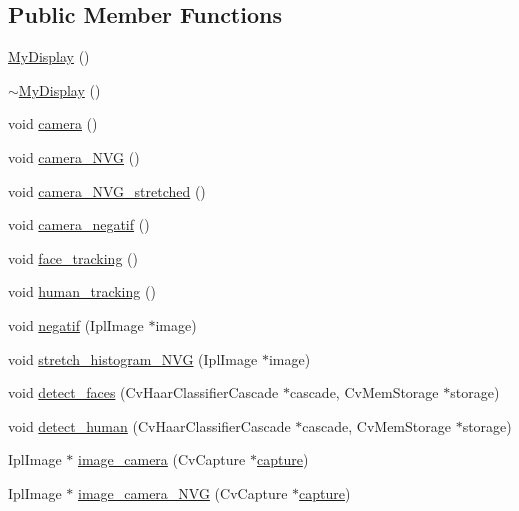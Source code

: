 \subsection*{Public Member Functions}
\begin{DoxyCompactItemize}
\item 
\hyperlink{classMyDisplay_aaf21029e4055eaadf1d750514b3b800a}{My\-Display} ()
\item 
\hyperlink{classMyDisplay_ac60f1fded498f57332783a5b66264c8c}{$\sim$\-My\-Display} ()
\item 
void \hyperlink{classMyDisplay_a00b712ee117708d620dc80d84d3e7281}{camera} ()
\item 
void \hyperlink{classMyDisplay_abfe046ec64aef3f9487e76c5a523bb48}{camera\-\_\-\-N\-V\-G} ()
\item 
void \hyperlink{classMyDisplay_a15661db4339f486356e93716c65a3a7a}{camera\-\_\-\-N\-V\-G\-\_\-stretched} ()
\item 
void \hyperlink{classMyDisplay_ac2ce70a95b5dd437951d3ebc7f3756d3}{camera\-\_\-negatif} ()
\item 
void \hyperlink{classMyDisplay_a8033377d23dca5526634eded73efb902}{face\-\_\-tracking} ()
\item 
void \hyperlink{classMyDisplay_a23cd838f0f2300db6370334ab60b99e6}{human\-\_\-tracking} ()
\item 
void \hyperlink{classMyDisplay_aed313dcbb8592f0786479321ebcadb54}{negatif} (Ipl\-Image $\ast$image)
\item 
void \hyperlink{classMyDisplay_a62ac61c3751293a48dad6a7254d039c0}{stretch\-\_\-histogram\-\_\-\-N\-V\-G} (Ipl\-Image $\ast$image)
\item 
void \hyperlink{classMyDisplay_a85d57087410b57368b92661fc63a6488}{detect\-\_\-faces} (Cv\-Haar\-Classifier\-Cascade $\ast$cascade, Cv\-Mem\-Storage $\ast$storage)
\item 
void \hyperlink{classMyDisplay_acbd50379c2ac9d3a275699550ba8530d}{detect\-\_\-human} (Cv\-Haar\-Classifier\-Cascade $\ast$cascade, Cv\-Mem\-Storage $\ast$storage)
\item 
Ipl\-Image $\ast$ \hyperlink{classMyDisplay_abc01f4d82f8eb6fffbc479fd56b7630e}{image\-\_\-camera} (Cv\-Capture $\ast$\hyperlink{classMyDisplay_aa2d469497bae80c2dc6596542a6af041}{capture})
\item 
Ipl\-Image $\ast$ \hyperlink{classMyDisplay_a745b42e0c45958feb46783864c53ecd2}{image\-\_\-camera\-\_\-\-N\-V\-G} (Cv\-Capture $\ast$\hyperlink{classMyDisplay_aa2d469497bae80c2dc6596542a6af041}{capture})
\item 

\end{DoxyCompactItemize}
